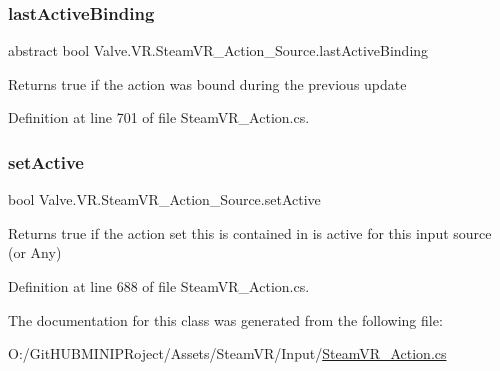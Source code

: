 \subsubsection{\texorpdfstring{lastActiveBinding}{lastActiveBinding}}
{\footnotesize\ttfamily abstract bool Valve.\+V\+R.\+Steam\+V\+R\+\_\+\+Action\+\_\+\+Source.\+last\+Active\+Binding\hspace{0.3cm}{\ttfamily [get]}}



Returns true if the action was bound during the previous update 



Definition at line 701 of file Steam\+V\+R\+\_\+\+Action.\+cs.

\mbox{\label{class_valve_1_1_v_r_1_1_steam_v_r___action___source_aafaed73b850687ab90ecbb2398df57e2}} 
\subsubsection{\texorpdfstring{setActive}{setActive}}
{\footnotesize\ttfamily bool Valve.\+V\+R.\+Steam\+V\+R\+\_\+\+Action\+\_\+\+Source.\+set\+Active\hspace{0.3cm}{\ttfamily [get]}}



Returns true if the action set this is contained in is active for this input source (or Any) 



Definition at line 688 of file Steam\+V\+R\+\_\+\+Action.\+cs.



The documentation for this class was generated from the following file\+:\begin{DoxyCompactItemize}
\item 
O\+:/\+Git\+H\+U\+B\+M\+I\+N\+I\+P\+Roject/\+Assets/\+Steam\+V\+R/\+Input/\mbox{\hyperlink{_steam_v_r___action_8cs}{Steam\+V\+R\+\_\+\+Action.\+cs}}\end{DoxyCompactItemize}
